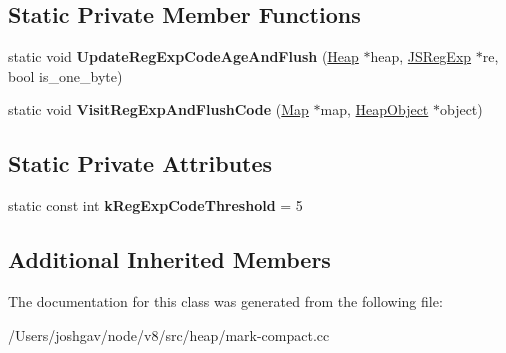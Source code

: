 \subsection*{Static Private Member Functions}
\begin{DoxyCompactItemize}
\item 
static void {\bfseries Update\+Reg\+Exp\+Code\+Age\+And\+Flush} (\hyperlink{classv8_1_1internal_1_1_heap}{Heap} $\ast$heap, \hyperlink{classv8_1_1internal_1_1_j_s_reg_exp}{J\+S\+Reg\+Exp} $\ast$re, bool is\+\_\+one\+\_\+byte)\hypertarget{classv8_1_1internal_1_1_mark_compact_marking_visitor_a8a1ed8eb3acdf5ab294ca8fe8dbd5e19}{}\label{classv8_1_1internal_1_1_mark_compact_marking_visitor_a8a1ed8eb3acdf5ab294ca8fe8dbd5e19}

\item 
static void {\bfseries Visit\+Reg\+Exp\+And\+Flush\+Code} (\hyperlink{classv8_1_1internal_1_1_map}{Map} $\ast$map, \hyperlink{classv8_1_1internal_1_1_heap_object}{Heap\+Object} $\ast$object)\hypertarget{classv8_1_1internal_1_1_mark_compact_marking_visitor_ac6816ac835343c65354a11f766bd8250}{}\label{classv8_1_1internal_1_1_mark_compact_marking_visitor_ac6816ac835343c65354a11f766bd8250}

\end{DoxyCompactItemize}
\subsection*{Static Private Attributes}
\begin{DoxyCompactItemize}
\item 
static const int {\bfseries k\+Reg\+Exp\+Code\+Threshold} = 5\hypertarget{classv8_1_1internal_1_1_mark_compact_marking_visitor_a302d4ba47d32e6b88946c0a0f809517b}{}\label{classv8_1_1internal_1_1_mark_compact_marking_visitor_a302d4ba47d32e6b88946c0a0f809517b}

\end{DoxyCompactItemize}
\subsection*{Additional Inherited Members}


The documentation for this class was generated from the following file\+:\begin{DoxyCompactItemize}
\item 
/\+Users/joshgav/node/v8/src/heap/mark-\/compact.\+cc\end{DoxyCompactItemize}
